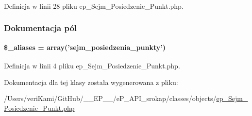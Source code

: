 Definicja w linii 28 pliku ep\-\_\-\-Sejm\-\_\-\-Posiedzenie\-\_\-\-Punkt.\-php.



\subsubsection{Dokumentacja pól}
\hypertarget{classep___sejm___posiedzenie___punkt_ab4e31d75f0bc5d512456911e5d01366b}{
\paragraph[{\$\-\_\-aliases}]{\setlength{\rightskip}{0pt plus 5cm}\$\-\_\-aliases = array('sejm\-\_\-posiedzenia\-\_\-punkty')}}\label{classep___sejm___posiedzenie___punkt_ab4e31d75f0bc5d512456911e5d01366b}


Definicja w linii 4 pliku ep\-\_\-\-Sejm\-\_\-\-Posiedzenie\-\_\-\-Punkt.\-php.



Dokumentacja dla tej klasy została wygenerowana z pliku\-:\begin{DoxyCompactItemize}
\item 
/\-Users/veri\-Kami/\-Git\-Hub/\-\_\-\-\_\-\-E\-P\-\_\-\-\_\-/e\-P\-\_\-\-A\-P\-I\-\_\-srokap/classes/objects/\hyperlink{ep___sejm___posiedzenie___punkt_8php}{ep\-\_\-\-Sejm\-\_\-\-Posiedzenie\-\_\-\-Punkt.\-php}\end{DoxyCompactItemize}
